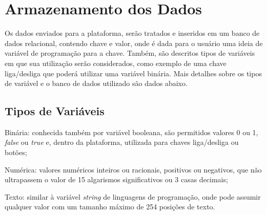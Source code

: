         \begin{figure}[!h]
    	\end{figure}

    \section{Armazenamento dos Dados}
    \label{sec:armazenamento-dados}
    
    Os dados enviados para a plataforma, serão tratados e inseridos em um banco de dados relacional, contendo chave e valor, onde é dada para o usuário uma ideia de variável de programação para a chave. Também, são descritos tipos de variáveis em que sua utilização serão considerados, como exemplo de uma chave liga/desliga que poderá utilizar uma variável binária. Mais detalhes sobre os tipos de variável e o banco de dados utilizado são dados abaixo.
    
        \subsection{Tipos de Variáveis}
        \label{sec:tipos-variaveis}
            
        \begin{alineascomponto}
            \item Binária: conhecida também por variável booleana, são permitidos valores 0 ou 1, \textit{false} ou \textit{true} e, dentro da plataforma, utilizada para chaves liga/desliga ou botões;
            \item Numérica: valores numéricos inteiros ou racionais, positivos ou negativos, que não ultrapassem o valor de 15 algarismos significativos ou 3 casas decimais;
            \item Texto: similar à variável \textit{string} de linguagens de programação, onde pode assumir qualquer valor com um tamanho máximo de 254 posições de texto.
        \end{alineascomponto}
        

